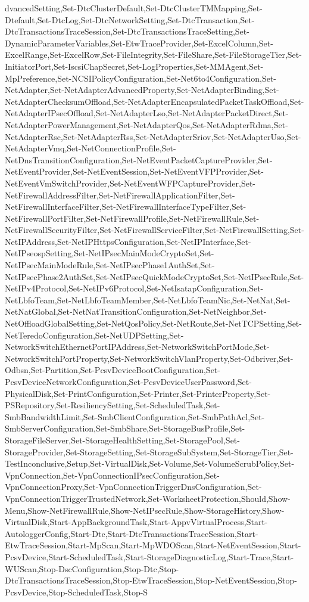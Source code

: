 {{dvancedSetting,Set-DtcClusterDefault,Set-DtcClusterTMMapping,Set-Dtefault,Set-DtcLog,Set-DtcNetworkSetting,Set-DtcTransaction,Set-DtcTransactionsTraceSession,Set-DtcTransactionsTraceSetting,Set-DynamicParameterVariables,Set-EtwTraceProvider,Set-ExcelColumn,Set-ExcelRange,Set-ExcelRow,Set-FileIntegrity,Set-FileShare,Set-FileStorageTier,Set-InitiatorPort,Set-IscsiChapSecret,Set-LogProperties,Set-MMAgent,Set-MpPreference,Set-NCSIPolicyConfiguration,Set-Net6to4Configuration,Set-NetAdapter,Set-NetAdapterAdvancedProperty,Set-NetAdapterBinding,Set-NetAdapterChecksumOffload,Set-NetAdapterEncapsulatedPacketTaskOffload,Set-NetAdapterIPsecOffload,Set-NetAdapterLso,Set-NetAdapterPacketDirect,Set-NetAdapterPowerManagement,Set-NetAdapterQos,Set-NetAdapterRdma,Set-NetAdapterRsc,Set-NetAdapterRss,Set-NetAdapterSriov,Set-NetAdapterUso,Set-NetAdapterVmq,Set-NetConnectionProfile,Set-NetDnsTransitionConfiguration,Set-NetEventPacketCaptureProvider,Set-NetEventProvider,Set-NetEventSession,Set-NetEventVFPProvider,Set-NetEventVmSwitchProvider,Set-NetEventWFPCaptureProvider,Set-NetFirewallAddressFilter,Set-NetFirewallApplicationFilter,Set-NetFirewallInterfaceFilter,Set-NetFirewallInterfaceTypeFilter,Set-NetFirewallPortFilter,Set-NetFirewallProfile,Set-NetFirewallRule,Set-NetFirewallSecurityFilter,Set-NetFirewallServiceFilter,Set-NetFirewallSetting,Set-NetIPAddress,Set-NetIPHttpsConfiguration,Set-NetIPInterface,Set-NetIPseospSetting,Set-NetIPsecMainModeCryptoSet,Set-NetIPsecMainModeRule,Set-NetIPsecPhase1AuthSet,Set-NetIPsecPhase2AuthSet,Set-NetIPsecQuickModeCryptoSet,Set-NetIPsecRule,Set-NetIPv4Protocol,Set-NetIPv6Protocol,Set-NetIsatapConfiguration,Set-NetLbfoTeam,Set-NetLbfoTeamMember,Set-NetLbfoTeamNic,Set-NetNat,Set-NetNatGlobal,Set-NetNatTransitionConfiguration,Set-NetNeighbor,Set-NetOffloadGlobalSetting,Set-NetQosPolicy,Set-NetRoute,Set-NetTCPSetting,Set-NetTeredoConfiguration,Set-NetUDPSetting,Set-NetworkSwitchEthernetPortIPAddress,Set-NetworkSwitchPortMode,Set-NetworkSwitchPortProperty,Set-NetworkSwitchVlanProperty,Set-Odbriver,Set-Odbsn,Set-Partition,Set-PcsvDeviceBootConfiguration,Set-PcsvDeviceNetworkConfiguration,Set-PcsvDeviceUserPassword,Set-PhysicalDisk,Set-PrintConfiguration,Set-Printer,Set-PrinterProperty,Set-PSRepository,Set-ResiliencySetting,Set-ScheduledTask,Set-SmbBandwidthLimit,Set-SmbClientConfiguration,Set-SmbPathAcl,Set-SmbServerConfiguration,Set-SmbShare,Set-StorageBusProfile,Set-StorageFileServer,Set-StorageHealthSetting,Set-StoragePool,Set-StorageProvider,Set-StorageSetting,Set-StorageSubSystem,Set-StorageTier,Set-TestInconclusive,Setup,Set-VirtualDisk,Set-Volume,Set-VolumeScrubPolicy,Set-VpnConnection,Set-VpnConnectionIPsecConfiguration,Set-VpnConnectionProxy,Set-VpnConnectionTriggerDnsConfiguration,Set-VpnConnectionTriggerTrustedNetwork,Set-WorksheetProtection,Should,Show-Menu,Show-NetFirewallRule,Show-NetIPsecRule,Show-StorageHistory,Show-VirtualDisk,Start-AppBackgroundTask,Start-AppvVirtualProcess,Start-AutologgerConfig,Start-Dtc,Start-DtcTransactionsTraceSession,Start-EtwTraceSession,Start-MpScan,Start-MpWDOScan,Start-NetEventSession,Start-PcsvDevice,Start-ScheduledTask,Start-StorageDiagnosticLog,Start-Trace,Start-WUScan,Stop-DscConfiguration,Stop-Dtc,Stop-DtcTransactionsTraceSession,Stop-EtwTraceSession,Stop-NetEventSession,Stop-PcsvDevice,Stop-ScheduledTask,Stop-S}}

